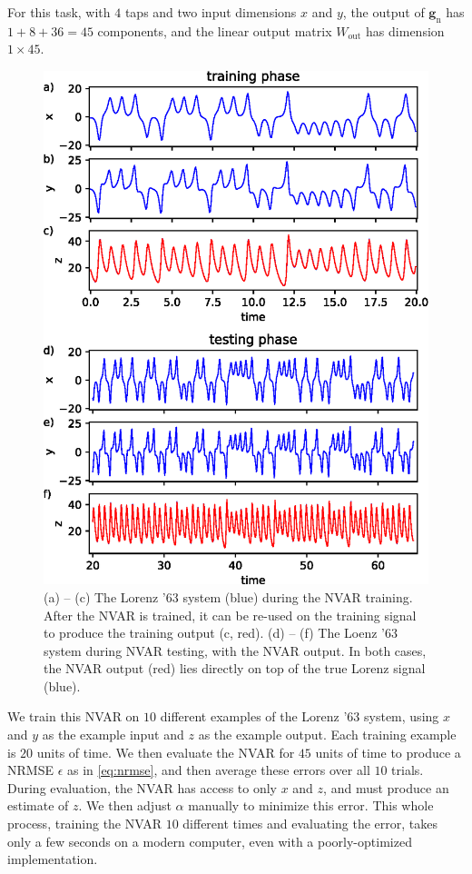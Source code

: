 For this task, with $4$ taps and two input dimensions $x$ and $y$, the
output of $\bm{g}_\text{n}$ has $1 + 8 + 36 = 45$ components, and the linear
output matrix $W_\text{out}$ has dimension $1 \times 45$.

\begin{figure}
  \includegraphics{figures/nvar-infer-lorenz}
  \caption{(a) -- (c) The Lorenz '63 system (blue) during the NVAR
    training. After the NVAR is trained, it can be re-used on the
    training signal to produce the training output (c, red). (d) --
    (f) The Loenz '63 system during NVAR testing, with the NVAR
    output. In both cases, the NVAR output (red) lies directly on top
    of the true Lorenz signal (blue).}
  \label{fig:nvar-infer-lorenz}
\end{figure}

We train this NVAR on $10$ different examples of the Lorenz '63
system, using $x$ and $y$ as the example input and $z$ as the example
output. Each training example is $20$ units of time. We then evaluate
the NVAR for $45$ units of time to produce a NRMSE $\epsilon$ as in
\cref{eq:nrmse}, and then average these errors over all $10$
trials. During evaluation, the NVAR has access to only $x$ and $z$,
and must produce an estimate of $z$. We then adjust $\alpha$ manually
to minimize this error. This whole process, training the NVAR $10$
different times and evaluating the error, takes only a few seconds on
a modern computer, even with a poorly-optimized implementation.

